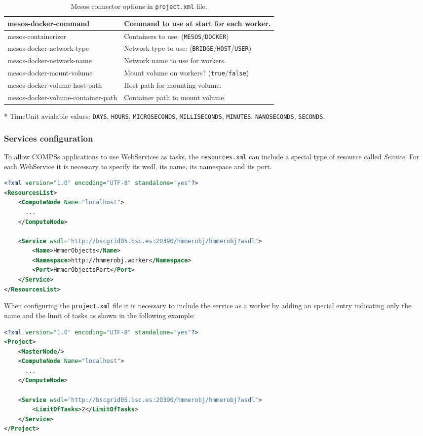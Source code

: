 \begin{table}[!ht]
\begin{tabularx}{\linewidth}{|l|X|}
	mesos-docker-command  & Command to use at start for each worker.\\ \hline

	mesos-containerizer  &  Containers to use: (\texttt{MESOS}/\texttt{DOCKER}) \\ \hline
  mesos-docker-network-type &  Network type to use: (\texttt{BRIDGE}/\texttt{HOST}/\texttt{USER}) \\ \hline
  mesos-docker-network-name & Network name to use for workers.\\ \hline
  mesos-docker-mount-volume & Mount volume on workers? (\texttt{true}/\texttt{false})\\ \hline
  mesos-docker-volume-host-path & Host path for mounting volume. \\ \hline
  mesos-docker-volume-container-path  & Container path to mount volume. \\ \hline
\end{tabularx}
\caption{Mesos connector options in \texttt{project.xml} file.}
\label{tab:mesos_extensions}
\end{table}

\newpage

\noindent
* TimeUnit avialable values: \texttt{DAYS}, \texttt{HOURS}, \texttt{MICROSECONDS}, \texttt{MILLISECONDS}, \texttt{MINUTES},
\texttt{NANOSECONDS}, \texttt{SECONDS}.
\subsubsection{Services configuration}
To allow COMPSs applications to use WebServices as tasks, the \texttt{resources.xml} can include a special type of resource called
\textit{Service}. For each WebService it is necessary to specify its wsdl, its name, its namespace and
its port.
\begin{lstlisting}[language=xml]
<?xml version="1.0" encoding="UTF-8" standalone="yes"?>
<ResourcesList>
    <ComputeNode Name="localhost">
      ...
    </ComputeNode>

    <Service wsdl="http://bscgrid05.bsc.es:20390/hmmerobj/hmmerobj?wsdl">
        <Name>HmmerObjects</Name>
        <Namespace>http://hmmerobj.worker</Namespace>
        <Port>HmmerObjectsPort</Port>
    </Service>
</ResourcesList>
\end{lstlisting}

When configuring the \texttt{project.xml} file it is necessary to include the service as a worker by adding an
special entry indicating only the name and the limit of tasks as shown in the following example:
\begin{lstlisting}[language=xml]
<?xml version="1.0" encoding="UTF-8" standalone="yes"?>
<Project>
    <MasterNode/>
    <ComputeNode Name="localhost">
      ...
    </ComputeNode>

    <Service wsdl="http://bscgrid05.bsc.es:20390/hmmerobj/hmmerobj?wsdl">
        <LimitOfTasks>2</LimitOfTasks>
    </Service>
</Project>
\end{lstlisting}

